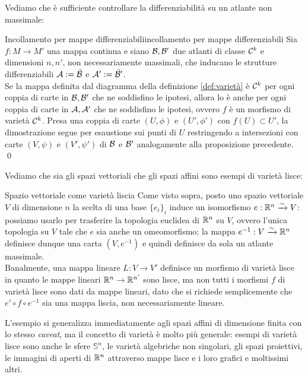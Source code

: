 \documentclass[openany]{book}
\renewcommand\C{\mc{C}}
\renewcommand\A{\mc{A}}
\begin{document}
Vediamo che è sufficiente controllare la differenziabilità su un atlante non massimale:

\begin{proposition}{Incollamento per mappe differenziabili}{incollamento per mappe differenziabili}
    Sia $f:M\to M'$ una mappa continua e siano $\mathcal{B},\mathcal{B}'$ due atlanti di classe $\C^k$ e dimensioni $n,n'$, non necessariamente massimali, che inducano le strutture differenziabili $\A := \bar\B$ e $\A':=\bar\B'$.\\
    Se la mappa definita dal diagramma della definizione \ref{def:varietà} è $\C^k$ per ogni coppia di carte in $\mathcal{B},\mathcal{B}'$ che ne soddisfino le ipotesi, allora lo è anche per ogni coppia di carte in $\A,\A'$ che ne soddisfino le ipotesi, ovvero $f$ è un morfismo di varietà $\C^k$.
    \proof 
    Presa una coppia di carte $(U,\phi)$ e $(U',\phi')$ con $f(U)\subset U'$, la dimostrazione segue per esaustione sui punti di $U$ restringendo a intersezioni con carte $(V,\psi)$ e $(V',\psi')$ di $\mathcal{B}$ e $\mathcal{B}'$ analogamente alla proposizione precedente.
    \qed
\end{proposition}

Vediamo che sia gli spazi vettoriali che gli spazi affini sono esempi di varietà lisce:

\begin{example}{Spazio vettoriale come varietà liscia}{}
    Come visto sopra, posto uno spazio vettoriale $V$ di dimensione $n$ la scelta di una base $\{e_i\}_i$ induce un isomorfismo $e:\mathbb{R}^n\xrightarrow{\sim} V$: possiamo usarlo per trasferire la topologia euclidea di $\mathbb{R}^n$ su $V$, ovvero l'unica topologia su $V$ tale che $e$ sia anche un omeomorfismo; la mappa $e^{-1}:V\xrightarrow{\sim} \mathbb{R}^n$ definisce dunque una carta  $(V,e^{-1})$ e quindi definisce da sola un atlante massimale.\\
    Banalmente, una mappa lineare $L:V\to V'$ definisce un morfismo di varietà lisce in quanto le mappe lineari $\mathbb{R}^n\to\mathbb{R}^{n'}$ sono lisce, ma non tutti i morfismi $f$ di varietà lisce sono dati da mappe lineari, dato che si richiede semplicemente che $e'\circ f\circ e^{-1}$ sia una mappa liscia, non necessariamente lineare.
\end{example}

L'esempio si generalizza immediatamente agli spazi affini di dimensione finita con lo stesso \textit{caveat}, ma il concetto di varietà è molto più generale: esempi di varietà lisce sono anche le sfere $\mathbb{S}^n$, le varietà algebriche non singolari, gli spazi proiettivi, le immagini di aperti di $\mathbb{R}^n$ attraverso mappe lisce e i loro grafici e moltissimi altri.
\end{document}
